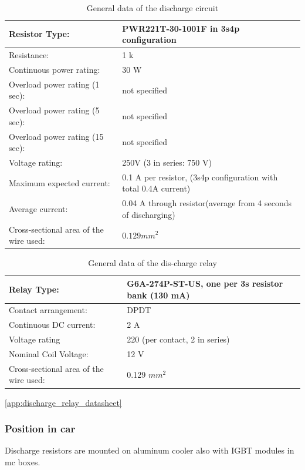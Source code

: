 \begin{table}[H]
	\centering
	\caption{General data of the discharge circuit}
	\begin{tabu}{|X|X|}
		\hline
		Resistor Type: & PWR221T-30-1001F in 3s4p configuration \\
		\hline
		Resistance: & 1 k\ohm \\
		\hline
		Continuous power rating: & 30 W \\
		\hline
		Overload power rating (1 sec): & not specified \\
		\hline
		Overload power rating (5 sec): & not specified \\
		\hline
		Overload power rating (15 sec): & not specified \\
		\hline
		Voltage rating: & 250V (3 in series: 750 V) \\
		\hline
		Maximum expected current: & 0.1 A per resistor, (3s4p configuration with total 0.4A current) \\
		\hline
		Average current: & 0.04 A through resistor(average from 4 seconds of discharging) \\
		\hline
		Cross-sectional area of the wire used: & $0.129 mm^2$ \\
		\hline
	\end{tabu}%
	\label{tab:dischrage-circ}%
\end{table}%

\begin{table}[H]
	\centering
	\caption{General data of the dis-charge relay}
	\begin{tabu}{|X|X|}
		\hline
		Relay Type: & G6A-274P-ST-US, one per 3s resistor bank (130 mA)\\
		\hline
		Contact arrangement: & DPDT \\
		\hline
		Continuous DC current: & 2 A \\
		\hline
		Voltage rating  & 220 \vdc (per contact, 2 in series) \\
		\hline
		Nominal Coil Voltage:  & 12 V\\
		\hline
		Cross-sectional area of the wire used: & 0.129 $mm^2$ \\
		\hline
	\end{tabu}%
	\label{tab:discharge-relay}%
\end{table}%

\ref{app:discharge_relay_datasheet}


\subsubsection{Position in car}

Discharge resistors are mounted on aluminum cooler also with IGBT modules in \gls{mc} boxes.